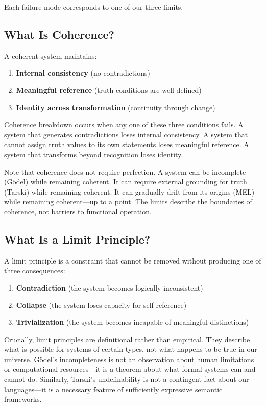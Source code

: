\documentclass[12pt]{article}
\begin{document}
Each failure mode corresponds to one of our three limits.

\subsection{What Is Coherence?}

A coherent system maintains:

\begin{enumerate}
    \item \textbf{Internal consistency} (no contradictions)
    \item \textbf{Meaningful reference} (truth conditions are well-defined)
    \item \textbf{Identity across transformation} (continuity through change)
\end{enumerate}

Coherence breakdown occurs when any one of these three conditions fails. A system that generates contradictions loses internal consistency. A system that cannot assign truth values to its own statements loses meaningful reference. A system that transforms beyond recognition loses identity.

Note that coherence does not require perfection. A system can be incomplete (Gödel) while remaining coherent. It can require external grounding for truth (Tarski) while remaining coherent. It can gradually drift from its origins (MEL) while remaining coherent—up to a point. The limits describe the boundaries of coherence, not barriers to functional operation.

\subsection{What Is a Limit Principle?}

A limit principle is a constraint that cannot be removed without producing one of three consequences:

\begin{enumerate}
    \item \textbf{Contradiction} (the system becomes logically inconsistent)
    \item \textbf{Collapse} (the system loses capacity for self-reference)
    \item \textbf{Trivialization} (the system becomes incapable of meaningful distinctions)
\end{enumerate}

Crucially, limit principles are definitional rather than empirical. They describe what is possible for systems of certain types, not what happens to be true in our universe. Gödel's incompleteness is not an observation about human limitations or computational resources—it is a theorem about what formal systems can and cannot do. Similarly, Tarski's undefinability is not a contingent fact about our languages—it is a necessary feature of sufficiently expressive semantic frameworks.
\end{document}
